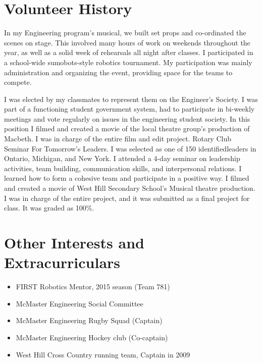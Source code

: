 \documentclass{curriculumVitae}
\begin{document}
\section {Volunteer History}
In my Engineering program's musical, we built set props and co-ordinated the scenes on stage. This involved many hours of work on weekends throughout the year, as well as a solid week of rehearsals all night after classes.
I participated in a school-wide sumobots-style robotics tournament. My participation was mainly administration and organizing the event, providing space for the teams to compete.

I was elected by my classmates to represent them on the Engineer's Society. I was part of a functioning student government system, had to participate in bi-weekly meetings and vote regularly on issues in the engineering student society.
In this position I filmed and created a movie of the local theatre group's production of Macbeth. I was in charge of the entire film and edit project. Rotary Club Seminar For Tomorrow's Leaders. I was selected as one of 150 identifiedleaders in Ontario, Michigan, and New York. I attended a 4-day seminar on leadership activities, team building, communication skills, and interpersonal relations. I learned how to form a cohesive team and participate in a positive way.
I filmed and created a movie of West Hill Secondary School's Musical theatre production. I was in charge of the entire project, and it was submitted as a final project for class. It was graded as 100\%.

\section {Other Interests and Extracurriculars}

\begin{itemize}
\item {FIRST Robotics Mentor, 2015 season (Team 781)}
\item {McMaster Engineering Social Committee}
\item {McMaster Engineering Rugby Squad (Captain)}
\item {McMaster Engineering Hockey club (Co-captain)}
\item {West Hill Cross Country running team, Captain in 2009}
\end{itemize}
\end{document}
